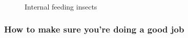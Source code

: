 \documentclass[
  letterpaper,
  oneside,
  open=any]{scrbook}
\begin{document}
\begin{figure}


\caption{\label{fig-internal}Internal feeding insects}

\end{figure}%

\subsubsection{How to make sure you're doing a good
job}\label{how-to-make-sure-youre-doing-a-good-job}
\end{document}
